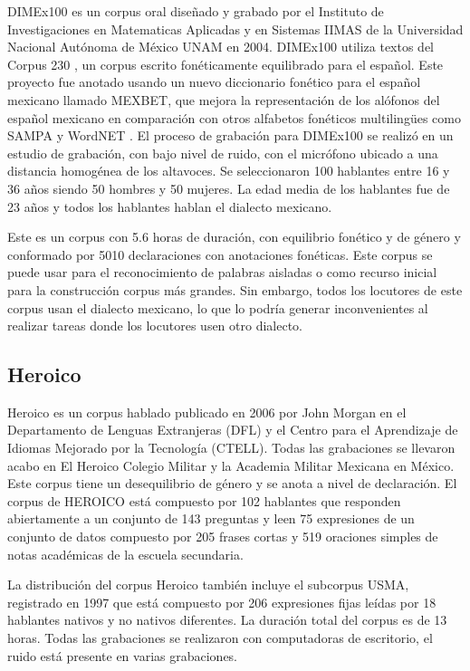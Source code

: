 DIMEx100 \cite{Pineda2004DIMEx100:Spanish} es un corpus oral diseñado y grabado por el Instituto de Investigaciones en Matematicas Aplicadas y en Sistemas IIMAS de la Universidad Nacional Autónoma de México UNAM en 2004. DIMEx100 utiliza textos del Corpus 230 \cite{Corpus230}, un corpus escrito fonéticamente equilibrado para el español. Este proyecto fue anotado usando un nuevo diccionario fonético para el español mexicano llamado MEXBET, que mejora la representación de los alófonos del español mexicano en comparación con otros alfabetos fonéticos multilingües como SAMPA y WordNET \cite{mexbet}. El proceso de grabación para DIMEx100 se realizó en un estudio de grabación, con bajo nivel de ruido, con el micrófono ubicado a una distancia homogénea de los altavoces. Se seleccionaron 100 hablantes entre 16 y 36 años siendo 50 hombres y 50 mujeres. La edad media de los hablantes fue de 23 años y todos los hablantes hablan el dialecto mexicano.

Este es un corpus con 5.6 horas de duración, con equilibrio fonético y de género y conformado por 5010 declaraciones con anotaciones fonéticas. Este corpus se puede usar para el reconocimiento de palabras aisladas o como recurso inicial para la construcción corpus más grandes. Sin embargo, todos los locutores de este corpus usan el dialecto mexicano, lo que lo podría generar inconvenientes al realizar tareas donde los locutores usen otro dialecto.

\subsection{Heroico}

Heroico \cite{heroico} es un corpus hablado publicado en 2006 por John Morgan en el Departamento de Lenguas Extranjeras (DFL) y el Centro para el Aprendizaje de Idiomas Mejorado por la Tecnología (CTELL). Todas las grabaciones se llevaron acabo en El Heroico Colegio Militar y la Academia Militar Mexicana en México. Este corpus tiene un desequilibrio de género y se anota a nivel de declaración. El corpus de HEROICO está compuesto por 102 hablantes que responden abiertamente a un conjunto de 143 preguntas y leen 75 expresiones de un conjunto de datos compuesto por 205 frases cortas y 519 oraciones simples de notas académicas de la escuela secundaria.

La distribución del corpus Heroico también incluye el subcorpus USMA, registrado en 1997 que está compuesto por 206 expresiones fijas leídas por 18 hablantes nativos y no nativos diferentes. La duración total del corpus es de 13 horas. Todas las grabaciones se realizaron con computadoras de escritorio, el ruido está presente en varias grabaciones.

